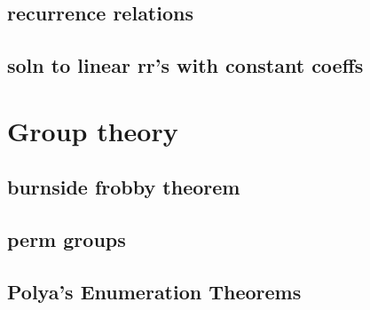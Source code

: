 \documentclass{article}
\begin{document}
\subsection{recurrence relations}
\subsection{soln to linear rr's with constant coeffs}
\section{Group theory}
\subsection{burnside frobby theorem}
\subsection{perm groups}
\subsection{Polya's Enumeration Theorems}
\end{document}
